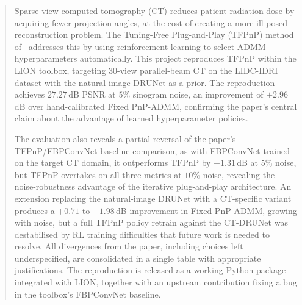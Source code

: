 \documentclass[11pt,a4paper,twoside]{report}
\begin{document}
\begin{abstract}
Sparse-view computed tomography (CT) reduces patient radiation dose by acquiring fewer projection angles, at the cost of creating a more ill-posed reconstruction problem. The Tuning-Free Plug-and-Play (TFPnP) method of~\citet{Wei2022TFPnP} addresses this by using reinforcement learning to select ADMM hyperparameters automatically. This project reproduces TFPnP within the LION toolbox, targeting 30-view parallel-beam CT on the LIDC-IDRI dataset with the natural-image DRUNet as a prior. The reproduction achieves $27.27$\,dB PSNR at $5\%$
sinogram noise, an improvement of $+2.96$\,dB over hand-calibrated Fixed PnP-ADMM, confirming the paper's central claim about the advantage of learned hyperparameter policies.

The evaluation also reveals a partial reversal of the paper's TFPnP/FBPConvNet baseline comparison, as with FBPConvNet trained on the target CT domain, it outperforms TFPnP by $+1.31$\,dB at $5\%$ noise, but TFPnP overtakes on all three metrics at $10\%$ noise, revealing the noise-robustness advantage of the iterative plug-and-play architecture. An extension replacing the natural-image DRUNet with a CT-specific variant produces a $+0.71$ to $+1.98$\,dB improvement in Fixed PnP-ADMM, growing with noise, but a full TFPnP policy retrain against the CT-DRUNet was destabilised by RL training difficulties that future work is needed to resolve. All divergences from the paper, including choices left underspecified, are consolidated in a single table with appropriate justifications. The reproduction is released as a working Python package integrated with LION, together with an upstream contribution fixing a bug in the toolbox's FBPConvNet baseline.
\end{abstract}

\newpage
{}
\setcounter{page}{0}
\pagestyle{plain}
\linespread{1.3}\selectfont
\tableofcontents
\listoffigures
\listoftables

\newpage
{}
\setcounter{page}{1}
\pagestyle{headings}




\end{document}
